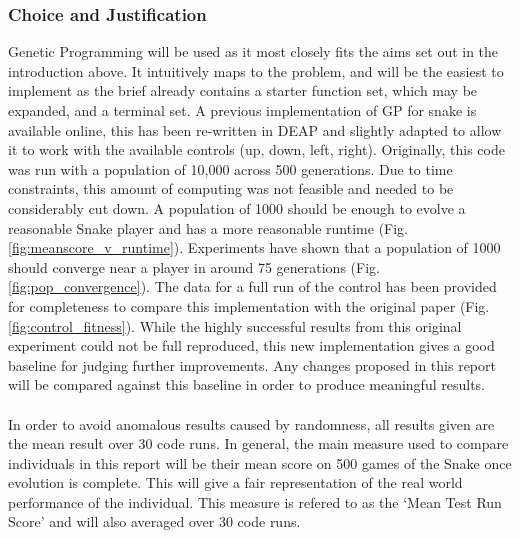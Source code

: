 \documentclass[12pt]{article}
\begin{document}
\subsubsection{Choice and Justification}
\label{justification}
Genetic Programming will be used as it most closely fits the aims set out in the introduction above. It intuitively maps to the problem, and will be the easiest to implement as the brief already contains a starter function set, which may be expanded, and a terminal set. A previous implementation of GP for snake is available online\cite{snake_blog}, this has been re-written in DEAP and slightly adapted to allow it to work with the available controls (up, down, left, right). Originally, this code was run with a population of 10,000 across 500 generations. Due to time constraints, this amount of computing was not feasible and needed to be considerably cut down. A population of 1000 should be enough to evolve a reasonable Snake player and has a more reasonable runtime (Fig. \ref{fig:meanscore_v_runtime}). Experiments have shown that a population of 1000 should converge near a player in around 75 generations (Fig. \ref{fig:pop_convergence}). The data for a full run of the control has been provided for completeness to compare this implementation with the original paper (Fig. \ref{fig:control_fitness}). While the highly successful results from this original experiment could not be full reproduced, this new implementation gives a good baseline for judging further improvements. Any changes proposed in this report will be compared against this baseline in order to produce meaningful results.
\\\\
In order to avoid anomalous results caused by randomness, all results given are the mean result over 30 code runs. In general, the main measure used to compare individuals in this report will be their mean score on 500 games of the Snake once evolution is complete. This will give a fair representation of the real world performance of the individual. This measure is refered to as the `Mean Test Run Score' and will also averaged over 30 code runs.
\end{document}
